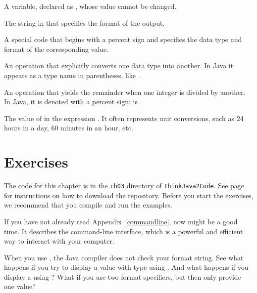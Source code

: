 \begin{description}
A variable, declared as , whose value cannot be changed.

The string in  that specifies the format of the output.

A special code that begins with a percent sign and specifies the data type and format of the corresponding value.

An operation that explicitly converts one data type into another.
In Java it appears as a type name in parentheses, like .


An operation that yields the remainder when one integer is divided by another.
In Java, it is denoted with a percent sign:  is .

The value of  in the expression .
It often represents unit conversions, such as 24 hours in a day, 60 minutes in an hour, etc.

\end{description}


\section{Exercises}

The code for this chapter is in the {\tt ch03} directory of {\tt ThinkJava2Code}.
See page~\pageref{code} for instructions on how to download the repository.
Before you start the exercises, we recommend that you compile and run the examples.

If you have not already read Appendix~\ref{commandline}, now might be a good time.
It describes the command-line interface, which is a powerful and efficient way to interact with your computer.


\begin{exercise}  %

When you use , the Java compiler does not check your format string.
See what happens if you try to display a value with type  using .
And what happens if you display a  using ?
What if you use two format specifiers, but then only provide one value?

\end{exercise}

